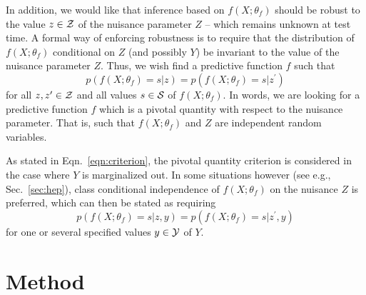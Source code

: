 \documentclass[twocolumn,superscriptaddress,aps]{revtex4-1}
\theoremstyle{plain}
\begin{document}
In addition, we would like that inference based on $f(X ; \theta_f)$ should be
robust to the value $z \in {\cal Z}$ of the nuisance parameter $Z$  -- which remains unknown at
test time. A formal way of enforcing robustness is to require that the distribution of
$f(X ; \theta_f)$ conditional on $Z$ (and possibly $Y$) be invariant to the value
 of the nuisance parameter $Z$. Thus, we wish find a predictive function $f$ such that
\begin{equation}\label{eqn:criterion}
    p(f(X ; \theta_f) = s | z ) = p(f(X ; \theta_f) = s | z^\prime )
\end{equation}
for all $z,z^\prime \in  {\cal Z}$ and all values $s \in {\cal S}$ of $f(X ; \theta_f)$.
In words, we are looking for a predictive function $f$
which is a pivotal quantity \citep{degroot1986probability} with respect to the
nuisance parameter. That is, such that  $f(X; \theta_f)$ and $Z$ are independent random variables.

As stated in Eqn.~\ref{eqn:criterion}, the pivotal quantity criterion is
considered in the case where $Y$ is marginalized out. In some situations
however (see e.g., Sec.~\ref{sec:hep}), class conditional independence of $f(X;
\theta_f)$ on the nuisance $Z$ is preferred, which can then be stated as
requiring
\begin{equation}\label{eqn:criterion-class}
    p(f(X ; \theta_f) = s | z, y ) = p(f(X ; \theta_f) = s | z^\prime, y )
\end{equation}
for one or several specified values $y \in {\cal Y}$ of $Y$.





\section{Method}
\label{sec:method}
\end{document}
